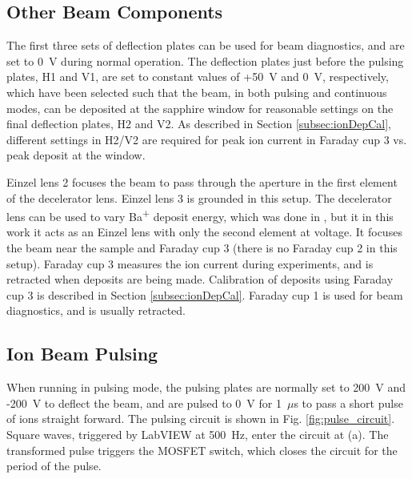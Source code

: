 \subsection{Other Beam Components}

The first three sets of deflection plates can be used for beam diagnostics, and are set to 0~V during normal operation.  The deflection plates just before the pulsing plates, H1 and V1, are set to constant values of +50~V and 0~V, respectively, which have been selected such that the beam, in both pulsing and continuous modes, can be deposited at the sapphire window for reasonable settings on the final deflection plates, H2 and V2.  As described in Section \ref{subsec:ionDepCal}, different settings in H2/V2 are required for peak ion current in Faraday cup 3 vs. peak deposit at the window.

Einzel lens 2 focuses the beam to pass through the aperture in the first element of the decelerator lens.  Einzel lens 3 is grounded in this setup.  The decelerator lens can be used to vary Ba\textsuperscript{+} deposit energy, which was done in \cite{Shon}, but it in this work it acts as an Einzel lens with only the second element at voltage.  It focuses the beam near the sample and Faraday cup 3 (there is no Faraday cup 2 in this setup).  Faraday cup 3 measures the ion current during experiments, and is retracted when deposits are being made.  Calibration of deposits using Faraday cup 3 is described in Section \ref{subsec:ionDepCal}.  Faraday cup 1 is used for beam diagnostics, and is usually retracted.  


\subsection{Ion Beam Pulsing}

When running in pulsing mode, the pulsing plates are normally set to 200~V and -200~V to deflect the beam, and are pulsed to 0~V for 1~$\mu$s to pass a short pulse of ions straight forward.  The pulsing circuit is shown in Fig. \ref{fig:pulse_circuit}.  Square waves, triggered by LabVIEW at 500~Hz, enter the circuit at (a). The transformed pulse triggers the MOSFET switch, which closes the circuit for the period of the pulse.

